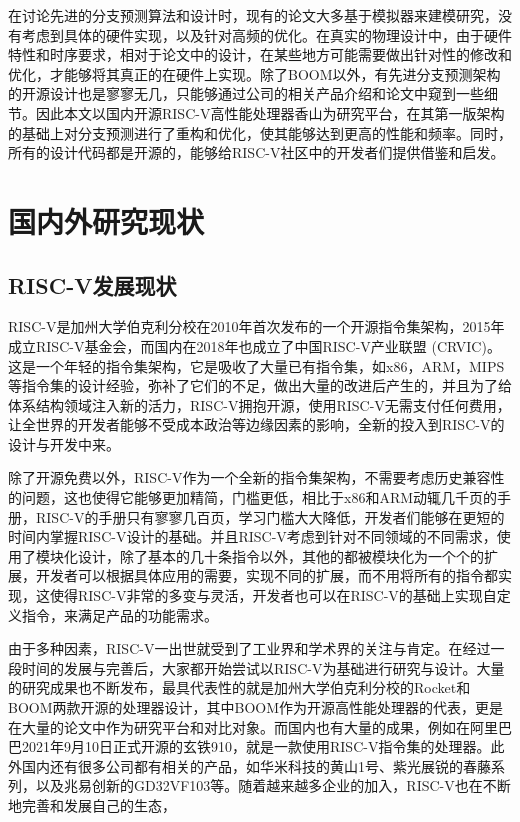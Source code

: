 在讨论先进的分支预测算法和设计时，现有的论文大多基于模拟器来建模研究，没有考虑到具体的硬件实现，以及针对高频的优化。在真实的物理设计中，由于硬件特性和时序要求，相对于论文中的设计，在某些地方可能需要做出针对性的修改和优化，才能够将其真正的在硬件上实现。除了BOOM以外，有先进分支预测架构的开源设计也是寥寥无几，只能够通过公司的相关产品介绍和论文中窥到一些细节。因此本文以国内开源RISC-V高性能处理器香山为研究平台，在其第一版架构的基础上对分支预测进行了重构和优化，使其能够达到更高的性能和频率。同时，所有的设计代码都是开源的，能够给RISC-V社区中的开发者们提供借鉴和启发。

\section{国内外研究现状}


\subsection{RISC-V发展现状}
RISC-V是加州大学伯克利分校在2010年首次发布的一个开源指令集架构，2015年成立RISC-V基金会，而国内在2018年也成立了中国RISC-V产业联盟 (CRVIC)。这是一个年轻的指令集架构，它是吸收了大量已有指令集，如x86，ARM，MIPS等指令集的设计经验，弥补了它们的不足，做出大量的改进后产生的，并且为了给体系结构领域注入新的活力，RISC-V拥抱开源，使用RISC-V无需支付任何费用，让全世界的开发者能够不受成本政治等边缘因素的影响，全新的投入到RISC-V的设计与开发中来。

除了开源免费以外，RISC-V作为一个全新的指令集架构，不需要考虑历史兼容性的问题，这也使得它能够更加精简，门槛更低，相比于x86和ARM动辄几千页的手册，RISC-V的手册只有寥寥几百页，学习门槛大大降低，开发者们能够在更短的时间内掌握RISC-V设计的基础。并且RISC-V考虑到针对不同领域的不同需求，使用了模块化设计，除了基本的几十条指令以外，其他的都被模块化为一个个的扩展，开发者可以根据具体应用的需要，实现不同的扩展，而不用将所有的指令都实现，这使得RISC-V非常的多变与灵活，开发者也可以在RISC-V的基础上实现自定义指令，来满足产品的功能需求。

由于多种因素，RISC-V一出世就受到了工业界和学术界的关注与肯定。在经过一段时间的发展与完善后，大家都开始尝试以RISC-V为基础进行研究与设计。大量的研究成果也不断发布，最具代表性的就是加州大学伯克利分校的Rocket和BOOM两款开源的处理器设计，其中BOOM作为开源高性能处理器的代表，更是在大量的论文中作为研究平台和对比对象。而国内也有大量的成果，例如在阿里巴巴2021年9月10日正式开源的玄铁910，就是一款使用RISC-V指令集的处理器。此外国内还有很多公司都有相关的产品，如华米科技的黄山1号、紫光展锐的春藤系列，以及兆易创新的GD32VF103等。随着越来越多企业的加入，RISC-V也在不断地完善和发展自己的生态，

